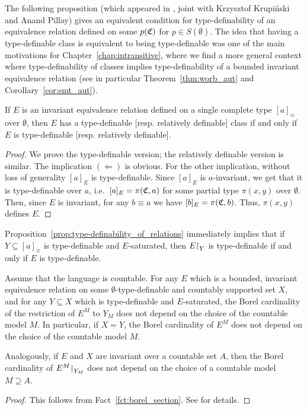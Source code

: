 	The following proposition (which appeared in \cite{KPR15}, joint with Krzysztof Krupiński and Anand Pillay) gives an equivalent condition for type-definability of an equivalence relation defined on some $p({\mathfrak C})$ for $p\in S(\emptyset)$.
	The idea that having a type-definable class is equivalent to being type-definable was one of the main motivations for Chapter~\ref{chap:intransitive}, where we find a more general context where type-definability of classes implies type-definability of a bounded invariant equivalence relation (see in particular Theorem~\ref{thm:worb_aut} and Corollary~\ref{cor:smt_aut}).
	\begin{prop}\label{prop:type-definability_of_relations}
		If $E$ is an invariant equivalence relation defined on
		a single complete type $[a]_{\equiv}$ over $\emptyset$, then $E$ has a type-definable [resp. relatively definable] class if and only if $E$ is type-definable [resp. relatively definable].
	\end{prop}
	\begin{proof}
		We prove the type-definable version; the relatively definable version is similar.
		The implication $(\Leftarrow)$ is obvious. For the other implication,
		without loss of generality $[a]_E$ is type-definable. Since $[a]_E$ is $a$-invariant, we get that it is type-definable over $a$, i.e.\ $[a]_E=\pi({\mathfrak C},a)$ for some partial type $\pi(x,y)$ over $\emptyset$. Then, since $E$ is invariant, for any $b \equiv a$ we have $[b]_E=\pi({\mathfrak C},b)$. Thus, $\pi(x,y)$ defines $E$.
	\end{proof}
	
	\begin{rem}
		\label{rem:tdf_iff_restr}
		Proposition~\ref{prop:type-definability_of_relations} immediately implies that if $Y\subseteq [a]_{\equiv}$ is type-definable and $E$-saturated, then $E\mathord{\upharpoonright}_Y$ is type-definable if and only if $E$ is type-definable.\xqed{\lozenge}
	\end{rem}
	
	
	\begin{fct}\label{fct:cartdf}
		Assume that the language is countable. For any $E$ which is a bounded, invariant equivalence relation on some $\emptyset$-type-definable and countably supported set $X$, and for any $Y\subseteq X$ which is type-definable and $E$-saturated, the Borel cardinality of the restriction of $E^M$ to $Y_M$ does not depend on the choice of the countable model $M$. In particular, if $X=Y$, the Borel cardinality of $E^M$ does not depend on the choice of the countable model $M$.
		
		Analogously, if $E$ and $X$ are invariant over a countable set $A$, then the Borel cardinality of $E^M\mathord{\upharpoonright}_{Y_M}$ does not depend on the choice of a countable model $M\supseteq A$.
	\end{fct}
	\begin{proof}
		This follows from Fact~\ref{fct:borel_section}. See \cite[Proposition 2.12]{KR16} for details.
	\end{proof}
	
